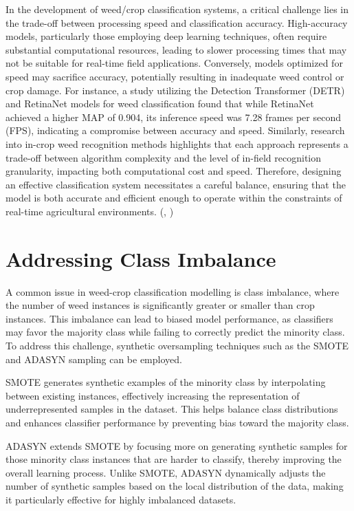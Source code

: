 \documentclass[letterpaper, notitlepage]{report}
\begin{document}
In the development of weed/crop classification systems, a critical challenge lies in the trade-off between processing speed and classification accuracy. High-accuracy models, particularly those employing deep learning techniques, often require substantial computational resources, leading to slower processing times that may not be suitable for real-time field applications. Conversely, models optimized for speed may sacrifice accuracy, potentially resulting in inadequate weed control or crop damage. For instance, a study utilizing the Detection Transformer (DETR) and RetinaNet models for weed classification found that while RetinaNet achieved a higher \gls{MAP} of 0.904, its inference speed was 7.28 frames per second (FPS), indicating a compromise between accuracy and speed. Similarly, research into in-crop weed recognition methods highlights that each approach represents a trade-off between algorithm complexity and the level of in-field recognition granularity, impacting both computational cost and speed. Therefore, designing an effective classification system necessitates a careful balance, ensuring that the model is both accurate and efficient enough to operate within the constraints of real-time agricultural environments. (\cite{Islam2025-wd}, \cite{Hu2024-nv})

\section{Addressing Class Imbalance}

A common issue in weed-crop classification modelling is class imbalance, where the number of weed instances is significantly greater or smaller than crop instances. This imbalance can lead to biased model performance, as classifiers may favor the majority class while failing to correctly predict the minority class. To address this challenge, synthetic oversampling techniques such as the \gls{SMOTE} and \gls{ADASYN} sampling can be employed.

SMOTE generates synthetic examples of the minority class by interpolating between existing instances, effectively increasing the representation of underrepresented samples in the dataset. This helps balance class distributions and enhances classifier performance by preventing bias toward the majority class.

ADASYN extends SMOTE by focusing more on generating synthetic samples for those minority class instances that are harder to classify, thereby improving the overall learning process. Unlike SMOTE, ADASYN dynamically adjusts the number of synthetic samples based on the local distribution of the data, making it particularly effective for highly imbalanced datasets.
\end{document}

